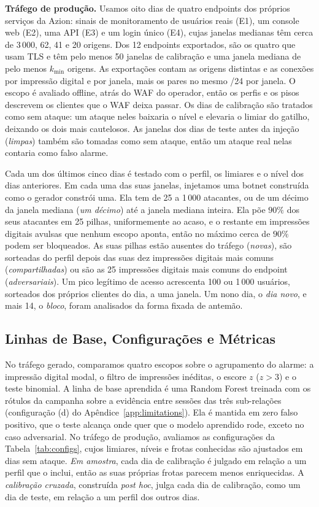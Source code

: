 \documentclass[conference,letterpaper,10pt]{IEEEtran}
\newcommand\1{\textit{(i)}}
\newcommand\2{\textit{(ii)}}
\newcommand\3{\textit{(iii)}}
\begin{document}
\textbf{Tráfego de produção.} Usamos oito dias de quatro endpoints dos próprios serviços da Azion: sinais de monitoramento de usuários reais (E1), um console web (E2), uma API (E3) e um login único (E4), cujas janelas medianas têm cerca de $3\,000$, 62, 41 e 20 origens. Dos 12 endpoints exportados, são os quatro que usam TLS e têm pelo menos 50 janelas de calibração e uma janela mediana de pelo menos $k_{\min}$ origens. As exportações contam as origens distintas e as conexões por impressão digital e por janela, mais os pares no mesmo /24 por janela. O escopo é avaliado offline, atrás do WAF do operador, então os perfis e os pisos descrevem os clientes que o WAF deixa passar. Os dias de calibração são tratados como sem ataque: um ataque neles baixaria o nível e elevaria o limiar do gatilho, deixando os dois mais cautelosos. As janelas dos dias de teste antes da injeção (\textit{limpas}) também são tomadas como sem ataque, então um ataque real nelas contaria como falso alarme.

Cada um dos últimos cinco dias é testado com o perfil, os limiares e o nível dos dias anteriores. Em cada uma das suas janelas, injetamos uma botnet construída como o gerador constrói uma. Ela tem de 25 a 1\,000 atacantes, ou de um décimo da janela mediana (\textit{um décimo}) até a janela mediana inteira. Ela põe $90\%$ dos seus atacantes em 25 pilhas, uniformemente ao acaso, e o restante em impressões digitais avulsas que nenhum escopo aponta, então no máximo cerca de $90\%$ podem ser bloqueados. As suas pilhas estão ausentes do tráfego (\textit{novas}), são sorteadas do perfil depois das suas dez impressões digitais mais comuns (\textit{compartilhadas}) ou são as 25 impressões digitais mais comuns do endpoint (\textit{adversariais}). Um pico legítimo de acesso acrescenta 100 ou 1\,000 usuários, sorteados dos próprios clientes do dia, a uma janela. Um nono dia, o \textit{dia novo}, e mais 14, o \textit{bloco}, foram analisados da forma fixada de antemão.

\subsection{Linhas de Base, Configurações e Métricas}
\label{sec:configs}

No tráfego gerado, comparamos quatro escopos sobre o agrupamento do alarme: a impressão digital modal, o filtro de impressões inéditas, o escore $z$ ($z > 3$) e o teste binomial. A linha de base aprendida é uma Random Forest treinada com os rótulos da campanha sobre a evidência entre sessões das três sub-relações (configuração (d) do Apêndice~\ref{app:limitations}). Ela é mantida em zero falso positivo, que o teste alcança onde quer que o modelo aprendido rode, exceto no caso adversarial. No tráfego de produção, avaliamos as configurações da Tabela~\ref{tab:configs}, cujos limiares, níveis e frotas conhecidas são ajustados em dias sem ataque. \textit{Em amostra}, cada dia de calibração é julgado em relação a um perfil que o inclui, então as suas próprias frotas parecem menos enriquecidas. A \textit{calibração cruzada}, construída \textit{post hoc}, julga cada dia de calibração, como um dia de teste, em relação a um perfil dos outros dias.
\end{document}
